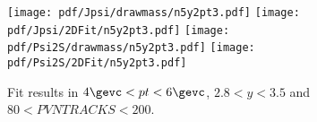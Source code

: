 \begin{figure}[H]
\begin{center}
\texttt{[image: pdf/Jpsi/drawmass/n5y2pt3.pdf]}
\texttt{[image: pdf/Jpsi/2DFit/n5y2pt3.pdf]}
\vspace*{-0.5cm}
\texttt{[image: pdf/Psi2S/drawmass/n5y2pt3.pdf]}
\texttt{[image: pdf/Psi2S/2DFit/n5y2pt3.pdf]}
\vspace*{-0.5cm}
\end{center}
\caption{Fit results in $4\gevc<pt<6\gevc$, $2.8<y<3.5$ and $80<PVNTRACKS<200$.}
\label{Fitn5y2pt3}
\end{figure}
